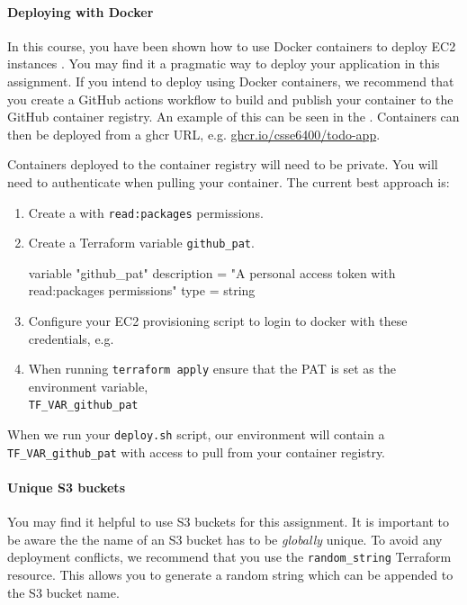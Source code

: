 \documentclass{csse4400}
\begin{document}
\paragraph{Deploying with Docker}
In this course,
you have been shown how to use Docker containers to deploy EC2 instances \cite{prac-week5}.
You may find it a pragmatic way to deploy your application in this assignment.
If you intend to deploy using Docker containers,
we recommend that you create a GitHub actions workflow
to build and publish your container to the GitHub container registry.
An example of this can be seen in the .
Containers can then be deployed from a ghcr URL, e.g. \url{ghcr.io/csse6400/todo-app}.

Containers deployed to the container registry will need to be private.
You will need to authenticate when pulling your container.
The current best approach is:

\begin{enumerate}
  \item Create a  with \texttt{read:packages} permissions.
  \item Create a Terraform variable \texttt{github\_pat}.
\begin{code}[language=terraform]{}
variable "github_pat" {
    description = "A personal access token with read:packages permissions"
    type        = string
}
\end{code}
  \item Configure your EC2 provisioning script to login to docker with these credentials, e.g.
  \item When running \texttt{terraform apply} ensure that the PAT is set as the environment variable,\\
  \texttt{TF\_VAR\_github\_pat}
\end{enumerate}

When we run your \texttt{deploy.sh} script,
our environment will contain a \texttt{TF\_VAR\_github\_pat} with access to pull from your container registry.


\paragraph{Unique S3 buckets}
You may find it helpful to use S3 buckets for this assignment.
It is important to be aware the the name of an S3 bucket has to be \textsl{globally} unique.
To avoid any deployment conflicts,
we recommend that you use the \texttt{random\_string} Terraform resource.
This allows you to generate a random string which can be appended to the S3 bucket name.
\end{document}
